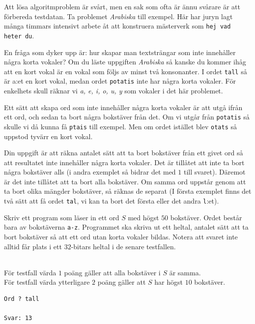 \newpage
{}

Att lösa algoritmproblem är svårt, men en sak som ofta är ännu svårare är att förbereda
testdatan. Ta problemet \textit{Arabiska} till exempel. Här har juryn lagt
många timmars intensivt arbete åt att konstruera mästerverk som \texttt{hej vad heter du}.

En fråga som dyker upp är: hur skapar man textsträngar som inte innehåller några korta vokaler?
Om du läste uppgiften \textit{Arabiska} så kanske du kommer ihåg att en kort vokal är en
vokal som följs av minst två konsonanter. I ordet \texttt{tall} så är a:et en kort vokal, medan
ordet \texttt{potatis} inte har några korta vokaler. För enkelhets skull räknar vi  \textit{a, e, i, o, u, y} 
som vokaler i det här problemet.


Ett sätt att skapa ord som inte innehåller några korta vokaler är att utgå ifrån ett ord,
och sedan ta bort några bokstäver från det. Om vi utgår från \texttt{potatis} så 
skulle vi då kunna få \texttt{ptais} till exempel. Men om ordet istället blev \texttt{otats} så uppstod
tyvärr en kort vokal.


Din uppgift är att räkna antalet sätt att ta bort bokstäver från ett givet ord så att resultatet inte
innehåller några korta vokaler. Det är tillåtet att inte ta bort några bokstäver alls (i andra exemplet
så bidrar det med $1$ till svaret). Däremot är det inte tillåtet att ta bort alla bokstäver. Om samma ord
uppstår genom att ta bort olika mängder bokstäver, så räknas de separat (I första exemplet finns det två sätt
att få ordet \texttt{tal}, vi kan ta bort det första eller det andra \texttt{l}:et).

Skriv ett program som läser in ett ord $S$ med högst $50$ bokstäver. Ordet består bara av bokstäverna \texttt{a-z}. Programmet ska skriva ut ett heltal, antalet sätt att ta bort bokstäver så att ett ord utan korta vokaler bildas. Notera att svaret inte alltid får plats i ett $32$-bitars heltal i de senare testfallen.

\\
För testfall värda $1$ poäng gäller att alla bokstäver i $S$ är samma.\\
För testfall värda ytterligare $2$ poäng gäller att $S$ har högst $10$ bokstäver.


\vspace{1cm}

\begin{verbatim}
Ord ? tall

Svar: 13
\end{verbatim}


